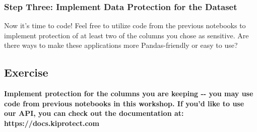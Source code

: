 \documentclass[11pt]{article}
\begin{document}
    \subsubsection{Step Three: Implement Data Protection for the
Dataset}\label{step-three-implement-data-protection-for-the-dataset}

Now it's time to code! Feel free to utilize code from the previous
notebooks to implement protection of at least two of the columns you
chose as sensitive. Are there ways to make these applications more
Pandas-friendly or easy to use?

    \subsection{Exercise}\label{exercise}

\textbf{Implement protection for the columns you are keeping -\/- you
may use code from previous notebooks in this workshop. If you'd like to
use our API, you can check out the documentation at:
https://docs.kiprotect.com }
\end{document}
